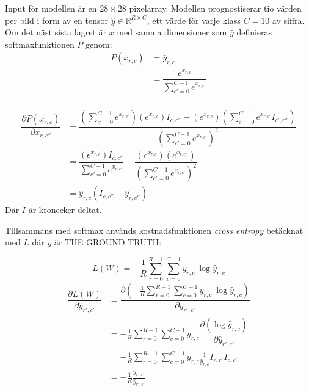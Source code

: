 \documentclass[a4paper,11pt,twoside]{article}
\newcommand*{\pd}[2]{\ensuremath{\dfrac{\partial #1}{\partial #2}}}
\begin{document}
Input för modellen är en $28 \times 28$ pixelarray. Modellen prognostiserar tio värden per bild i form av en tensor $\hat{y} \in \mathbb{R}^{R \times C}$, ett värde för varje klass $C=10$ av siffra. Om det näst sista lagret är $x$ med samma dimensioner som $\hat{y}$ definieras softmaxfunktionen $P$ genom: \cite{cs231n} \cite{notesonbackprop} \cite{websoftmax} 
\begin{equation}
\begin{split}
P(x_{r,c}) 
	& = \hat{y}_{r,c} \\
	& = \dfrac{e^{x_{r,c}}}{\sum^{C-1}_{c'=0}e^{x_{r,c'}}}\\
\end{split}
\end{equation}

\begin{equation}
\begin{split}
\pd{P(x_{r,c})}{x_{r,c''}}
	& = \dfrac{(\sum^{C-1}_{c'=0}e^{x_{r,c'}}) (e^{x_{r,c}})I_{c,c''} - (e^{x_{r,c}})(\sum^{C-1}_{c'=0}e^{x_{r,c'}} I_{c',c''})}{(\sum^{C-1}_{c'=0}e^{x_{r,c'}})^2} \\
	& = \dfrac{(e^{x_{r,c}})I_{c,c''}}{\sum^{C-1}_{c'=0}e^{x_{r,c'}}} - \dfrac{(e^{x_{r,c}})(e^{x_{r,c''}})}{(\sum^{C-1}_{c'=0}e^{x_{r,c'}})^2} \\
	& = \hat{y}_{r,c}(I_{c,c''}-\hat{y}_{r,c''})
\end{split}
\end{equation}
Där $I$ är kronecker-deltat.

Tillsammans med softmax används kostnadsfunktionen \textit{cross entropy} betäcknat med $L$ där $y$ är THE GROUND TRUTH: \cite{cs231n} \cite{notesonbackprop}

\begin{equation}
L(W) = - \frac{1}{R}\sum^{R-1}_{r=0} \sum^{C-1}_{c=0}y_{r,c} \ \log{\hat{y}_{r,c}}
\end{equation}
\begin{equation}
\begin{split}
\pd{L(W)}{\hat{y}_{r',c'}} 
	& = \pd{\left(-\frac{1}{R}\sum^{R-1}_{r=0} \sum^{C-1}_{c=0}y_{r,c} \ \log{\hat{y}_{r,c}}\right)}{\hat{y}_{r',c'}} \\
	& = -\frac{1}{R}\sum^{R-1}_{r=0} \sum^{C-1}_{c=0}y_{r,c} \pd{\left(\log{\hat{y}_{r,c}}\right)}{\hat{y}_{r',c'}} \\
	& = - \frac{1}{R}\sum^{R-1}_{r=0} \sum^{C-1}_{c=0} y_{r,c} \frac{1}{\hat{y}_{r,c}} I_{r, r'} I_{c, c'}\\
	& = - \frac{1}{R} \frac{y_{r',c'}}{\hat{y}_{r',c'}} \\
\end{split}
\end{equation}
\end{document}
